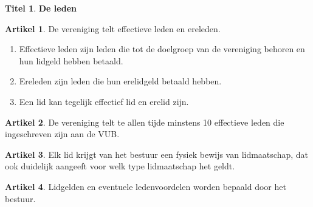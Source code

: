 \documentclass[a4paper,10pt]{article}
\theoremstyle{definition}
\newtheorem{titel}{\newline\Large Titel}
\newtheorem{artikel}{\large Artikel}
\newcommand{\ttext}[1]{\Large \textbf{#1} \normalsize}
\newcommand{\ttextcr}{\hfill\newline}
\begin{document}
\begin{titel}\ttext{De leden}

  \begin{artikel}\ttextcr
    De vereniging telt effectieve leden en ereleden.
    \begin{enumerate}
      \item
        Effectieve leden zijn leden die tot de doelgroep van de vereniging behoren en hun lidgeld hebben betaald.
      \item
        Ereleden zijn leden die hun erelidgeld betaald hebben.
      \item
        Een lid kan tegelijk effectief lid en erelid zijn.
    \end{enumerate}
  \end{artikel}

  \begin{artikel}\ttextcr
    De vereniging telt te allen tijde minstens 10 effectieve leden die ingeschreven zijn aan de VUB.
  \end{artikel}

  \begin{artikel}\ttextcr
    Elk lid krijgt van het bestuur een fysiek bewijs van lidmaatschap, dat ook duidelijk aangeeft voor welk type lidmaatschap het geldt.
  \end{artikel}

  \begin{artikel}\ttextcr
    Lidgelden en eventuele ledenvoordelen worden bepaald door het bestuur.
  \end{artikel}

\end{titel}

\end{document}
